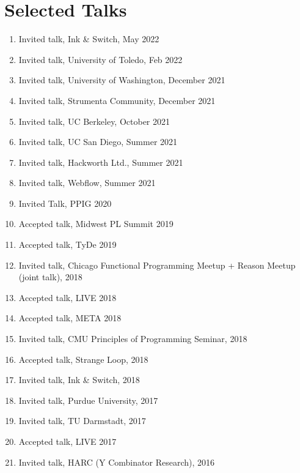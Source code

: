 \documentclass[10pt,letterpaper]{article}
\renewenvironment{itemize}{
  \begin{list}{}{
    \setlength{\leftmargin}{1.25em}
    \setlength{\itemsep}{0.25em}
    \setlength{\parskip}{0pt}
    \setlength{\parsep}{0.2em}
  }
}{
  \end{list}
}
\begin{document}
\section*{Selected Talks}
\begin{enumerate}
  \item Invited talk, Ink \& Switch, May 2022
  \item Invited talk, University of Toledo, Feb 2022
  \item Invited talk, University of Washington, December 2021
  \item Invited talk, Strumenta Community, December 2021
  \item Invited talk, UC Berkeley, October 2021
  \item Invited talk, UC San Diego, Summer 2021
  \item Invited talk, Hackworth Ltd., Summer 2021
  \item Invited talk, Webflow, Summer 2021
  \item Invited Talk, PPIG 2020
  \item Accepted talk, Midwest PL Summit 2019
  \item Accepted talk, TyDe 2019
  \item Invited talk, Chicago Functional Programming Meetup + Reason Meetup (joint talk), 2018
  \item Accepted talk, LIVE 2018
  \item Accepted talk, META 2018
  \item Invited talk, CMU Principles of Programming Seminar, 2018
  \item Accepted talk, Strange Loop, 2018 
  \item Invited talk, Ink \& Switch, 2018
  \item Invited talk, Purdue University, 2017
  \item Invited talk, TU Darmstadt, 2017
  \item Accepted talk, LIVE 2017
  \item Invited talk, HARC (Y Combinator Research), 2016

\end{enumerate}
\end{document}
